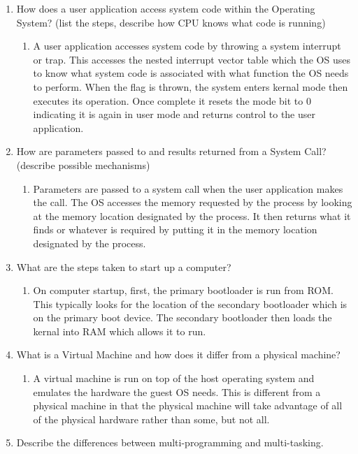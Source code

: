 \documentclass[a4paper, 11pt]{article}
\begin{document}
\begin{enumerate}
\begin{enumerate}
  \end{enumerate}
  \item How does a user application access system code within the Operating System? (list the steps, describe how CPU knows what code is running)
  \begin{enumerate}
    \item A user application accesses system code by throwing a system interrupt or trap. This accesses the nested interrupt vector table which the OS uses to know what system code is associated with what function the OS needs to perform. When the flag is thrown, the system enters kernal mode then executes its operation. Once complete it resets the mode bit to 0 indicating it is again in user mode and returns control to the user application.
  \end{enumerate}
  \item How are parameters passed to and results returned from a System Call? (describe possible mechanisms)
  \begin{enumerate}
    \item Parameters are passed to a system call when the user application makes the call. The OS accesses the memory requested by the process by looking at the memory location designated by the process. It then returns what it finds or whatever is required by putting it in the memory location designated by the process.
  \end{enumerate}
  \item What are the steps taken to start up a computer?
  \begin{enumerate}
    \item On computer startup, first, the primary bootloader is run from ROM. This typically looks for the location of the secondary bootloader which is on the primary boot device. The secondary bootloader then loads the kernal into RAM which allows it to run.
  \end{enumerate}
  \item What is a Virtual Machine and how does it differ from a physical machine?
  \begin{enumerate}
    \item A virtual machine is run on top of the host operating system and emulates the hardware the guest OS needs. This is different from a physical machine in that the physical machine will take advantage of all of the physical hardware rather than some, but not all.
  \end{enumerate}
  \item Describe the differences between multi-programming and multi-tasking.

\end{enumerate}
\end{document}
